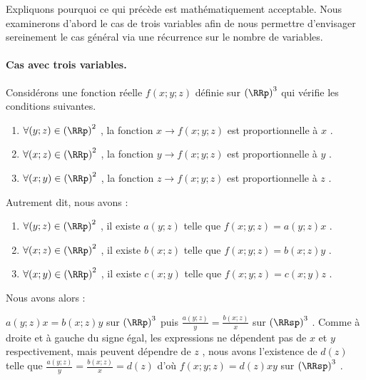 Expliquons pourquoi ce qui précède est mathématiquement acceptable. Nous examinerons d'abord le cas de trois variables afin de nous permettre d'envisager sereinement le cas général via une récurrence sur le nombre de variables.




\paragraph{Cas avec trois variables.}

Considérons une fonction réelle $f(x ; y ; z)$ définie sur $\left( \RRp \right)^3$ qui vérifie les conditions suivantes.

\begin{enumerate}
	\item $\forall (y ; z) \in \left( \RRp \right)^2$ , la fonction $x \rightarrow f(x ; y ; z)$ est proportionnelle à $x$ . 

	\item $\forall (x ; z) \in \left( \RRp \right)^2$ , la fonction $y \rightarrow f(x ; y ; z)$ est proportionnelle à $y$ . 

	\item $\forall (x ; y) \in \left( \RRp \right)^2$ , la fonction $z \rightarrow f(x ; y ; z)$ est proportionnelle à $z$ . 
\end{enumerate}


Autrement dit, nous avons :

\begin{enumerate}
	\item $\forall (y ; z) \in \left( \RRp \right)^2$ , il existe $a(y; z)$ telle que $f(x ; y ; z) = a(y ; z) x$ . 

	\item $\forall (x ; z) \in \left( \RRp \right)^2$ , il existe $b(x; z)$ telle que $f(x ; y ; z) = b(x ; z) y$ . 

	\item $\forall (x ; y) \in \left( \RRp \right)^2$ , il existe $c(x; y)$ telle que $f(x ; y ; z) = c(x ; y) z$ . 
\end{enumerate}


Nous avons alors :

\smallskip

$a(y ; z) x = b(x ; z) y$ sur $\left( \RRp \right)^3$ puis $\frac{a(y ; z)}{y} = \frac{b(x ; z)}{x}$ sur $\left( \RRsp \right)^3$ .
Comme à droite et à gauche du signe égal, les expressions ne dépendent pas de $x$ et $y$ respectivement, mais peuvent dépendre de $z$ , nous avons l'existence de $d(z)$ telle que $\frac{a(y ; z)}{y} = \frac{b(x ; z)}{x} = d(z)$ d'où $f(x ; y ; z) = d(z) x y$ sur $\left( \RRsp \right)^3$ .


